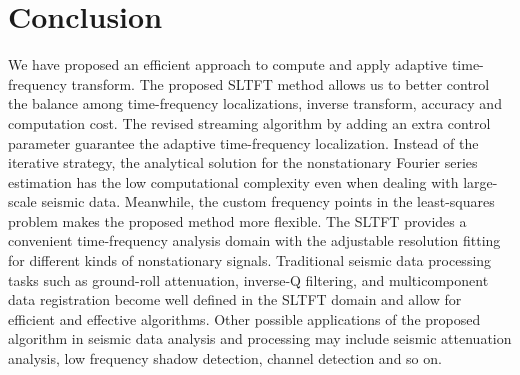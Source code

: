 \section{Conclusion} 

We have proposed an efficient approach to compute and apply adaptive
time-frequency transform. The proposed SLTFT method allows us to
better control the balance among time-frequency localizations, inverse
transform, accuracy and computation cost. The revised streaming
algorithm by adding an extra control parameter guarantee the adaptive
time-frequency localization. Instead of the iterative strategy, the
analytical solution for the nonstationary Fourier series estimation
has the low computational complexity even when dealing with
large-scale seismic data. Meanwhile, the custom frequency points in
the least-squares problem makes the proposed method more flexible. The
SLTFT provides a convenient time-frequency analysis domain with the
adjustable resolution fitting for different kinds of nonstationary
signals. Traditional seismic data processing tasks such as ground-roll
attenuation, inverse-Q filtering, and multicomponent data registration
become well defined in the SLTFT domain and allow for efficient and
effective algorithms. Other possible applications of the proposed
algorithm in seismic data analysis and processing may include seismic
attenuation analysis, low frequency shadow detection, channel
detection and so on.




